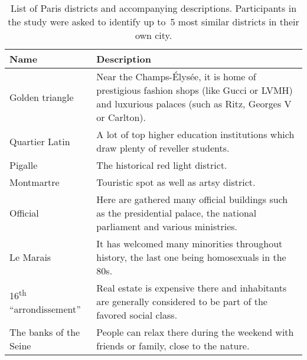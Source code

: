 \begin{table}[ht]
	\centering
	\begin{tabularx}{\textwidth}{lX}
		\toprule
		Name & Description \\
		\midrule
		Golden triangle & Near the Champs-Élysée, it is home of prestigious fashion shops (like Gucci or LVMH) and luxurious palaces (such as Ritz, Georges V or Carlton). \\
		Quartier Latin & A lot of top higher education institutions which draw plenty of reveller students. \\
		Pigalle & The historical red light district. \\
		Montmartre & Touristic spot as well as artsy district. \\
		Official & Here are gathered many official buildings such as the presidential palace, the national parliament and various ministries. \\
		Le Marais & It has welcomed many minorities throughout history, the last one being homosexuals in the 80s. \\
		16\textsuperscript{th} \enquote{arrondissement} & Real estate is expensive there and inhabitants are generally considered to be part of the favored social class. \\
		The banks of the Seine & People can relax there during the weekend with friends or family, close to the nature. \\
		\bottomrule
	\end{tabularx}
	\caption[Ground truth neighborhoods]{List of Paris districts and accompanying
		descriptions. Participants in the study were asked to identify up to~5 most
	similar districts in their own city.\label{tab:district}}
\end{table}
